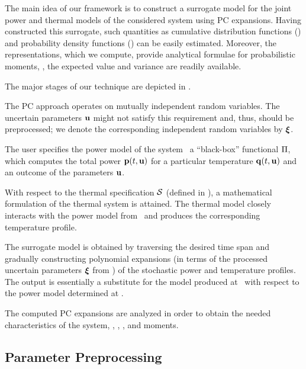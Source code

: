 The main idea of our framework is to construct a surrogate model for the joint
power and thermal models of the considered system using PC expansions. Having
constructed this surrogate, such quantities as cumulative distribution functions
(\cdfs) and probability density functions (\pdfs) can be easily estimated.
Moreover, the representations, which we compute, provide analytical formulae for
probabilistic moments, \ie, the expected value and variance are readily
available.

The major stages of our technique are depicted in .

The PC approach operates on mutually independent random variables. The uncertain
parameters $\mathbf{u}$ might not satisfy this requirement and, thus, should be
preprocessed; we denote the corresponding independent random variables by $\boldsymbol{\xi}$.

The user specifies the power model of the system \via\ a ``black-box''
functional $\oPower$, which computes the total power $\mathbf{p}(t, \mathbf{u})$ for a
particular temperature $\mathbf{q}(t, \mathbf{u})$ and an outcome of the parameters $\mathbf{u}$.

With respect to the thermal specification $\mathcal{S}$ (defined in
), a mathematical formulation of the thermal system is
attained. The thermal model closely interacts with the power model from
\ and produces the corresponding temperature profile.

The surrogate model is obtained by traversing the desired time span and
gradually constructing polynomial expansions (in terms of the processed
uncertain parameters $\boldsymbol{\xi}$ from ) of the stochastic power and
temperature profiles. The output is essentially a substitute for the model
produced at \ with respect to the power model determined at .

The computed PC expansions are analyzed in order to obtain the needed
characteristics of the system, \eg, \cdfs, \pdfs, and moments.

\subsection{Parameter Preprocessing} 


